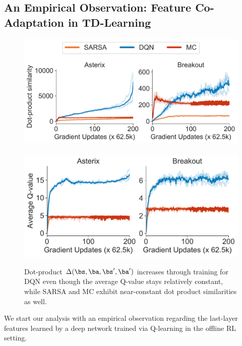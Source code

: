\subsection{An Empirical Observation: Feature Co-Adaptation in TD-Learning}
\begin{figure}
    \centering
    \vspace{-15pt}
    \includegraphics[width=0.97\linewidth]{section3_figs/figure1_dotproduct_dot_products.pdf}\\
    ~~~\includegraphics[width=0.94\linewidth]{section3_figs/figure1_dotproduct_q_values (1).pdf}
    \vspace{-0.24cm}
    \caption{\small{Dot-product $\Delta(\bs, \ba, \bs', \ba')$ increases through training for DQN even though the average Q-value stays relatively constant, while SARSA and MC exhibit near-constant dot product similarities as well.}}  
    \label{fig:dot_products}
    \vspace{-0.4cm}
\end{figure}
We start our analysis with an empirical observation regarding the last-layer features learned by a deep network trained via Q-learning in the offline RL setting.
